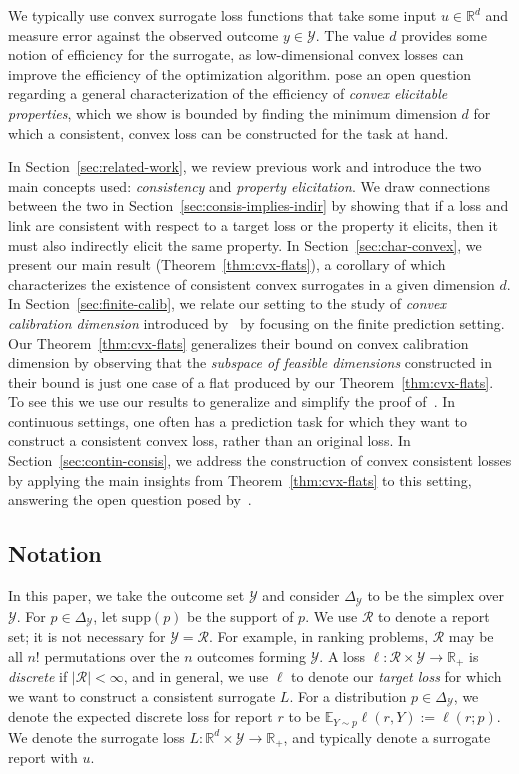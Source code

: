 \documentclass{article}
\newcommand{\reals}{\mathbb{R}}
\newcommand{\simplex}{\Delta_\Y}
\newcommand{\supp}{\mathrm{supp}}
\newcommand{\E}{\mathbb{E}}
\newcommand{\R}{\mathcal{R}}
\newcommand{\Y}{\mathcal{Y}}
\begin{document}
We typically use convex surrogate loss functions that take some input $u \in \reals^d$ and measure error against the observed outcome $y \in \Y$.
The value $d$ provides some notion of efficiency for the surrogate, as low-dimensional convex losses can improve the efficiency of the optimization algorithm.
\cite{frongillo2015elicitation} pose an open question regarding a general characterization of the efficiency of \emph{convex elicitable properties}, which we show is bounded by finding the minimum dimension $d$ for which a consistent, convex loss can be constructed for the task at hand.

In Section~\ref{sec:related-work}, we review previous work and introduce the two main concepts used: \emph{consistency} and \emph{property elicitation}.
We draw connections between the two in Section~\ref{sec:consis-implies-indir} by showing that if a loss and link are consistent with respect to a target loss or the property it elicits, then it must also indirectly elicit the same property.
In Section~\ref{sec:char-convex}, we present our main result (Theorem~\ref{thm:cvx-flats}), a corollary of which characterizes the existence of consistent convex surrogates in a given dimension $d$.
In Section~\ref{sec:finite-calib}, we relate our setting to the study of \emph{convex calibration dimension} introduced by~\cite{ramaswamy2016convex} by focusing on the finite prediction setting.
Our Theorem~\ref{thm:cvx-flats} generalizes their bound on convex calibration dimension by observing that the \emph{subspace of feasible dimensions} constructed in their bound is just one case of a flat produced by our Theorem~\ref{thm:cvx-flats}.
To see this we use our results to generalize and simplify the proof of~\cite[Theorem 16]{ramaswamy2016convex}.
In continuous settings, one often has a prediction task for which they want to construct a consistent convex loss, rather than an original loss.
In Section~\ref{sec:contin-consis}, we address the construction of convex consistent losses by applying the main insights from Theorem~\ref{thm:cvx-flats} to this setting, answering the open question posed by~\cite[Section 8]{frongillo2018elicitation}.

\subsection{Notation}
In this paper, we take the outcome set $\Y$ and consider $\simplex$ to be the simplex over $\Y$.
For $p \in \simplex$, let $\supp(p)$ be the support of $p$.
We use $\R$ to denote a report set; it is not necessary for $\Y = \R$.  
For example, in ranking problems, $\R$ may be all $n!$ permutations over the $n$ outcomes forming $\Y$.
A loss $\ell : \R \times \Y \to \reals_+$ is \emph{discrete} if $|\R| < \infty$, and in general, we use $\ell$ to denote our \emph{target loss} for which we want to construct a consistent surrogate $L$.
For a distribution $p \in \simplex$, we denote the expected discrete loss for report $r$ to be $\E_{Y \sim p} \ell(r, Y) := \ell(r; p)$.
We denote the surrogate loss $L : \reals^d \times \Y \to \reals_+$, and typically denote a surrogate report with $u$.
\end{document}
